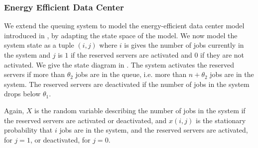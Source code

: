 \subsubsection*{Energy Efficient Data Center}\label{sec:cloud:data_centers:modeling:energy_efficient}

We extend the queuing system to model the energy-efficient data center model introduced in , by adapting the state space of the model.
We now model the system state as a tuple \((i,j)\) where \(i\) is gives the number of jobs currently in the system and \(j\) is \(1\) if the reserved servers are activated and \(0\) if they are not activated.
We give the state diagram in .
The system activates the reserved servers if more than \(\theta_2\) jobs are in the queue, i.e. more than \(n + \theta_2\) jobs are in the system.
The reserved servers are deactivated if the number of jobs in the system drops below \(\theta_1\).

Again, \(X\) is the random variable describing the number of jobs in the system if the reserved servers are activated or deactivated, and \(x(i, j)\) is the stationary probability that \(i\) jobs are in the system, and the reserved servers are activated, for \(j=1\), or deactivated, for \(j=0\). 

